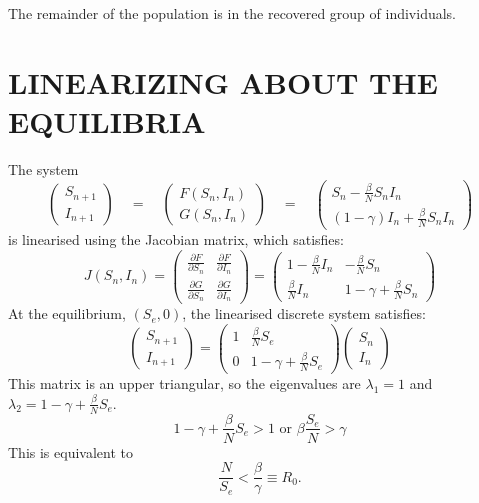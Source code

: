 \documentclass[12pt]{report}
\newcommand{\sps}{\\[0.2cm]}
\newcommand{\spn}[1]{\\[#1cm]}
\newcommand{\NI}{\noindent}
\newcommand{\dsp}{\displaystyle}
\begin{document}
	\NI The remainder of the population is in the recovered group of individuals.\sps
	
	\section{LINEARIZING ABOUT THE EQUILIBRIA}
	The system
	\begin{equation*}
		\begin{pmatrix}
			S_{n+1}\\
			I_{n+1}
		\end{pmatrix} \quad=\quad
		\begin{pmatrix}
			F(S_n, I_n) \\
			G(S_n, I_n)
		\end{pmatrix}\quad=\quad
		\begin{pmatrix}
			S_n - \frac{\beta}{N}S_nI_n\\
			(1-\gamma)I_n + \frac{\beta}{N}S_nI_n
		\end{pmatrix}
	\end{equation*}
	is linearised using the Jacobian matrix, which satisfies:
	\begin{equation*}
		J(S_n, I_n) = 
			\begin{pmatrix}
				\dsp\frac{\partial F}{\partial S_n} & \dsp\frac{\partial F}{\partial I_n}\spn{0.5}
				\dsp\frac{\partial G}{\partial S_n} & \dsp\frac{\partial G}{\partial I_n}
			\end{pmatrix}
			=
			\begin{pmatrix}
				\dsp 1 - \frac{\beta}{N}I_n & -\dsp\frac{\beta}{N}S_n\spn{0.5}
				\dsp\frac{\beta}{N}I_n & 1 - \dsp\gamma+\frac{\beta}{N}S_n
			\end{pmatrix}
	\end{equation*}
	At the equilibrium, $(S_e, 0)$, the linearised discrete system satisfies:
	\begin{equation*}
		\begin{pmatrix}
			S_{n+1}\spn{0.5}
			I_{n+1}
		\end{pmatrix}
		=
		\begin{pmatrix}
			1 & \dsp \frac{\beta}{N}S_e \spn{0.5}
			0 & \dsp 1 - \gamma + \frac{\beta}{N}S_e
		\end{pmatrix}
		\begin{pmatrix}
			S_n \spn{0.5}
			I_n
		\end{pmatrix}
	\end{equation*}
	This matrix is an upper triangular, so the eigenvalues are $\lambda_1 = 1$ and $\lambda_2=1-\gamma + \dsp \frac{\beta}{N}S_e$.
	\begin{equation*}
		1-\gamma+\frac{\beta}{N}S_e > 1 \text{ or } \beta\frac{S_e}{N} > \gamma
	\end{equation*}
	This is equivalent to
	\begin{equation*}
		\frac{N}{S_e} < \frac{\beta}{\gamma} \equiv R_0.
	\end{equation*}
	
\end{document}
